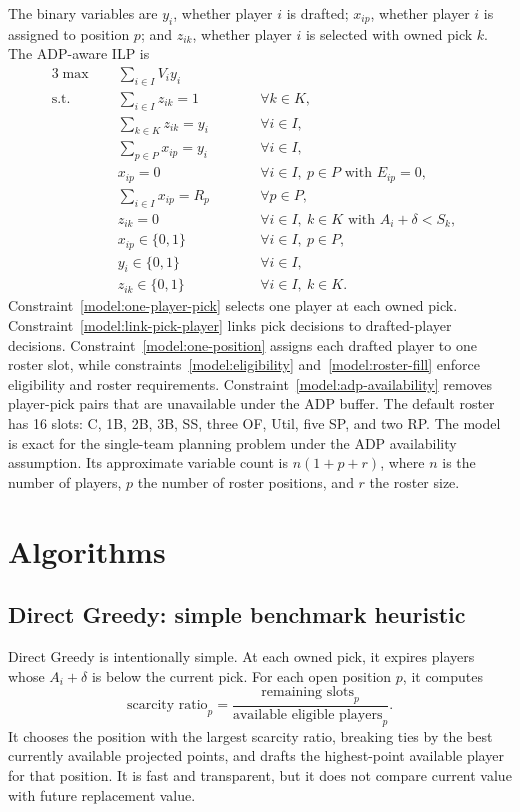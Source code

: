 \documentclass[12pt]{article}
\begin{document}
The binary variables are \(y_i\), whether player \(i\) is drafted; \(x_{ip}\), whether player \(i\) is assigned to position \(p\); and \(z_{ik}\), whether player \(i\) is selected with owned pick \(k\). The ADP-aware ILP is
\begin{alignat}{3}
\max \quad
& \sum_{i\in I} V_i y_i
& \qquad & & \label{model:obj}\\
\text{s.t.}\quad
& \sum_{i\in I} z_{ik}=1
& & \forall k\in K, & \label{model:one-player-pick}\\
& \sum_{k\in K} z_{ik}=y_i
& & \forall i\in I, & \label{model:link-pick-player}\\
& \sum_{p\in P} x_{ip}=y_i
& & \forall i\in I, & \label{model:one-position}\\
& x_{ip}=0
& & \forall i\in I,\ p\in P \text{ with } E_{ip}=0, & \label{model:eligibility}\\
& \sum_{i\in I} x_{ip}=R_p
& & \forall p\in P, & \label{model:roster-fill}\\
& z_{ik}=0
& & \forall i\in I,\ k\in K \text{ with } A_i+\delta<S_k, & \label{model:adp-availability}\\
& x_{ip}\in\{0,1\}
& & \forall i\in I,\ p\in P, & \label{model:x-binary}\\
& y_i\in\{0,1\}
& & \forall i\in I, & \label{model:y-binary}\\
& z_{ik}\in\{0,1\}
& & \forall i\in I,\ k\in K. & \label{model:z-binary}
\end{alignat}
Constraint~\eqref{model:one-player-pick} selects one player at each owned pick. Constraint~\eqref{model:link-pick-player} links pick decisions to drafted-player decisions. Constraint~\eqref{model:one-position} assigns each drafted player to one roster slot, while constraints~\eqref{model:eligibility} and~\eqref{model:roster-fill} enforce eligibility and roster requirements. Constraint~\eqref{model:adp-availability} removes player-pick pairs that are unavailable under the ADP buffer.
The default roster has 16 slots: C, 1B, 2B, 3B, SS, three OF, Util, five SP, and two RP. The model is exact for the single-team planning problem under the ADP availability assumption. Its approximate variable count is \(n(1+p+r)\), where \(n\) is the number of players, \(p\) the number of roster positions, and \(r\) the roster size.

\section{Algorithms}
\subsection{Direct Greedy: simple benchmark heuristic}
Direct Greedy is intentionally simple. At each owned pick, it expires players whose \(A_i+\delta\) is below the current pick. For each open position \(p\), it computes
\[
\text{scarcity ratio}_p=\frac{\text{remaining slots}_p}{\text{available eligible players}_p}.
\]
It chooses the position with the largest scarcity ratio, breaking ties by the best currently available projected points, and drafts the highest-point available player for that position. It is fast and transparent, but it does not compare current value with future replacement value.
\end{document}
